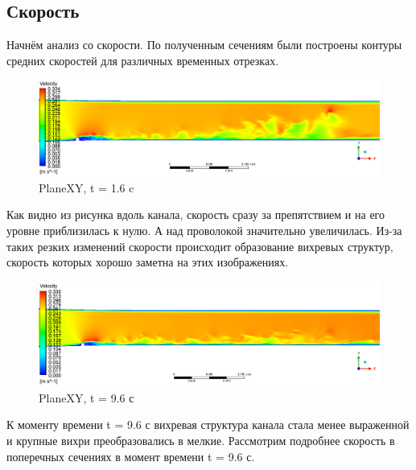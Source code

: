 \subsection{Скорость}
	Начнём анализ со скорости. По полученным сечениям были построены контуры средних скоростей для различных временных отрезках.
	\begin{figure}[H]
		\centering
		\includegraphics[width=1\linewidth]{../Assets/T16_Velocity_ContourXY}
		\caption{PlaneXY, t = 1.6 c}
		\label{fig:t16velocitycontourxy}
	\end{figure}
	Как видно из рисунка вдоль канала, скорость сразу за препятствием и на его уровне приблизилась к нулю. А над проволокой значительно увеличилась. Из-за таких резких изменений скорости происходит образование вихревых структур, скорость которых хорошо заметна на этих изображениях.
	\begin{figure}[H]
		\centering
		\includegraphics[width=1\linewidth]{../Assets/T96_Velocity_ContourXY}
		\caption{PlaneXY, t = 9.6 с}
		\label{fig:t96velocitycontourxy}
	\end{figure}
	К моменту времени t = 9.6 с вихревая структура канала стала менее выраженной и крупные вихри преобразовались в мелкие. 
	Рассмотрим подробнее скорость в поперечных сечениях в момент времени t = 9.6 с.
